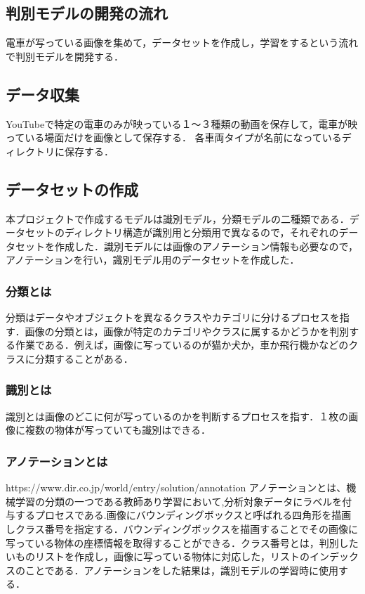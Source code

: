 \begin{multicols*}{2}
\section{判別モデルの開発の流れ}
電車が写っている画像を集めて，データセットを作成し，学習をするという流れで判別モデルを開発する．

\subsection{データ収集}
	YouTubeで特定の電車のみが映っている１〜３種類の動画を保存して，電車が映っている場面だけを画像として保存する．
	各車両タイプが名前になっているディレクトリに保存する．
	
\subsection{データセットの作成}
本プロジェクトで作成するモデルは識別モデル，分類モデルの二種類である．データセットのディレクトリ構造が識別用と分類用で異なるので，それぞれのデータセットを作成した．識別モデルには画像のアノテーション情報も必要なので，アノテーションを行い，識別モデル用のデータセットを作成した．
\subsubsection{分類とは}
分類はデータやオブジェクトを異なるクラスやカテゴリに分けるプロセスを指す．画像の分類とは，画像が特定のカテゴリやクラスに属するかどうかを判別する作業である．例えば，画像に写っているのが猫か犬か，車か飛行機かなどのクラスに分類することがある．
\subsubsection{識別とは}
識別とは画像のどこに何が写っているのかを判断するプロセスを指す．１枚の画像に複数の物体が写っていても識別はできる．

\subsubsection{アノテーションとは}
https://www.dir.co.jp/world/entry/solution/annotation
アノテーションとは、機械学習の分類の一つである教師あり学習において,分析対象データにラベルを付与するプロセスである.画像にバウンディングボックスと呼ばれる四角形を描画しクラス番号を指定する．バウンディングボックスを描画することでその画像に写っている物体の座標情報を取得することができる．クラス番号とは，判別したいものリストを作成し，画像に写っている物体に対応した，リストのインデックスのことである．アノテーションをした結果は，識別モデルの学習時に使用する．


\end{multicols*}
